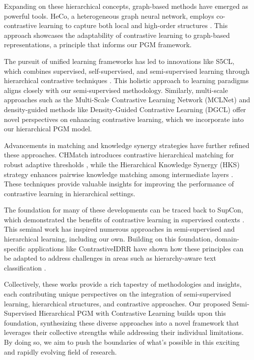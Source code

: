 \documentclass[conference]{IEEEtran}
\begin{document}
Expanding on these hierarchical concepts, graph-based methods have emerged as powerful tools. HeCo, a heterogeneous graph neural network, employs co-contrastive learning to capture both local and high-order structures \cite{heco}. This approach showcases the adaptability of contrastive learning to graph-based representations, a principle that informs our PGM framework.

The pursuit of unified learning frameworks has led to innovations like S5CL, which combines supervised, self-supervised, and semi-supervised learning through hierarchical contrastive techniques \cite{s5cl}. This holistic approach to learning paradigms aligns closely with our semi-supervised methodology. Similarly, multi-scale approaches such as the Multi-Scale Contrastive Learning Network (MCLNet) \cite{mclnet} and density-guided methods like Density-Guided Contrastive Learning (DGCL) \cite{dgcl} offer novel perspectives on enhancing contrastive learning, which we incorporate into our hierarchical PGM model.

Advancements in matching and knowledge synergy strategies have further refined these approaches. CHMatch introduces contrastive hierarchical matching for robust adaptive thresholds \cite{chmatch}, while the Hierarchical Knowledge Synergy (HKS) strategy enhances pairwise knowledge matching among intermediate layers \cite{hks}. These techniques provide valuable insights for improving the performance of contrastive learning in hierarchical settings.

The foundation for many of these developments can be traced back to SupCon, which demonstrated the benefits of contrastive learning in supervised contexts \cite{supcon}. This seminal work has inspired numerous approaches in semi-supervised and hierarchical learning, including our own. Building on this foundation, domain-specific applications like ContrastiveIDRR have shown how these principles can be adapted to address challenges in areas such as hierarchy-aware text classification \cite{contrastiveidrr}.

Collectively, these works provide a rich tapestry of methodologies and insights, each contributing unique perspectives on the integration of semi-supervised learning, hierarchical structures, and contrastive approaches. Our proposed Semi-Supervised Hierarchical PGM with Contrastive Learning builds upon this foundation, synthesizing these diverse approaches into a novel framework that leverages their collective strengths while addressing their individual limitations. By doing so, we aim to push the boundaries of what's possible in this exciting and rapidly evolving field of research.
\end{document}
